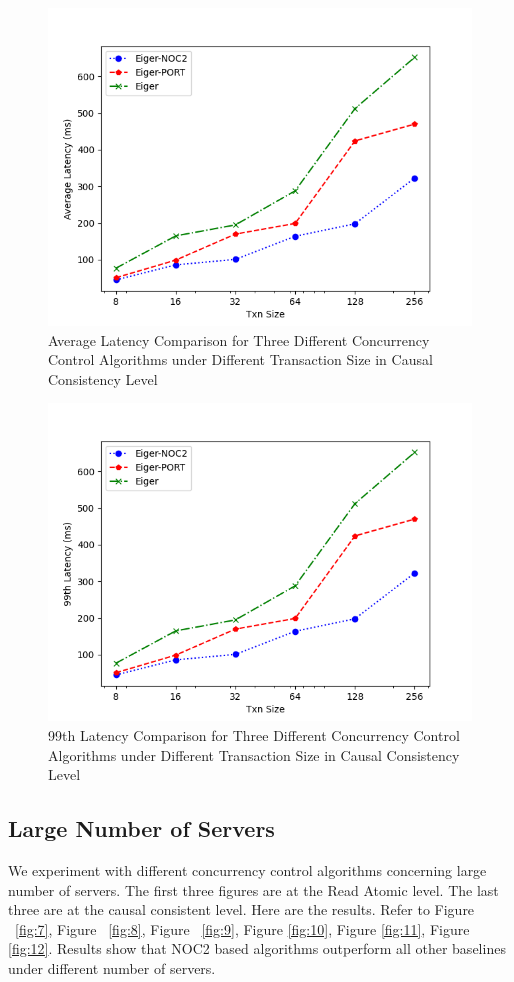 \begin{figure}
    \centering
    \includegraphics[width=0.8\linewidth]{figure/1-tcc-al.png}
    \caption{Average Latency Comparison for Three Different Concurrency Control Algorithms under Different Transaction Size in Causal Consistency Level}
    \label{fig:5}
\end{figure}


\begin{figure}
    \centering
    \includegraphics[width=0.8\linewidth]{figure/1-tcc-l.png}
    \caption{99th Latency Comparison for Three Different Concurrency Control Algorithms under Different Transaction Size in Causal Consistency Level}
    \label{fig:6}
\end{figure}

\newpage

\subsection{Large Number of Servers}
We experiment with different concurrency control algorithms concerning large number of servers. The first three figures are at the Read Atomic level. The last three are at the causal consistent level. Here are the results. Refer to Figure ~\ref{fig:7}, Figure ~\ref{fig:8}, Figure ~\ref{fig:9}, Figure \ref{fig:10}, Figure \ref{fig:11}, Figure \ref{fig:12}.  Results show that NOC2 based algorithms outperform all other baselines under different number of servers.


